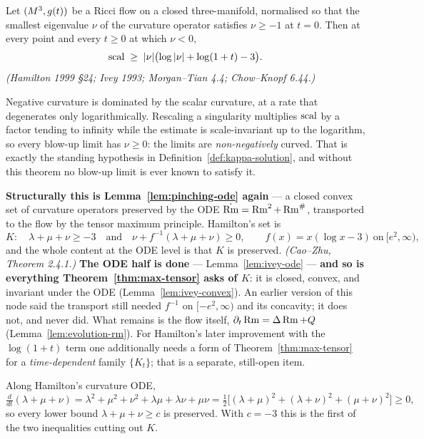\begin{theorem}
  \label{thm:hamilton-ivey}
  Let $(M^3, g(t))$ be a Ricci flow on a closed three-manifold, normalised so
  that the smallest eigenvalue $\nu$ of the curvature operator satisfies
  $\nu \ge -1$ at $t = 0$. Then at every point and every $t \ge 0$ at which
  $\nu < 0$,
  \[
    \operatorname{scal} \;\ge\; |\nu| \bigl( \log |\nu| + \log(1+t) - 3 \bigr).
  \]
  \emph{(Hamilton 1999 §24; Ivey 1993; Morgan--Tian 4.4; Chow--Knopf 6.44.)}

  Negative curvature is dominated by the scalar curvature, at a rate that
  degenerates only logarithmically. Rescaling a singularity multiplies $\operatorname{scal}$
  by a factor tending to infinity while the estimate is scale-invariant up to
  the logarithm, so every blow-up limit has $\nu \ge 0$: the limits are
  \emph{non-negatively} curved. That is exactly the standing hypothesis in
  Definition~\ref{def:kappa-solution}, and without this theorem no blow-up
  limit is ever known to satisfy it.

  \textbf{Structurally this is Lemma~\ref{lem:pinching-ode} again} --- a closed
  convex set of curvature operators preserved by the ODE
  $\dot{\operatorname{Rm}} = \operatorname{Rm}^2 + \operatorname{Rm}^{\#}$, transported to the flow by the tensor
  maximum principle. Hamilton's set is
  \[
    K : \quad \lambda+\mu+\nu \ge -3
    \quad\text{and}\quad
    \nu + f^{-1}(\lambda+\mu+\nu) \ge 0,
    \qquad f(x) = x(\log x - 3) \ \text{on}\ [e^2,\infty),
  \]
  and the whole content at the ODE level is that $K$ is preserved.
  \emph{(Cao--Zhu, Theorem 2.4.1.)} \textbf{The ODE half is done} ---
  Lemma~\ref{lem:ivey-ode} --- \textbf{and so is everything
  Theorem~\ref{thm:max-tensor} asks of $K$}: it is closed, convex, and
  invariant under the ODE (Lemma~\ref{lem:ivey-convex}). An earlier version of
  this node said the transport still needed $f^{-1}$ on $[-e^2,\infty)$ and its
  concavity; it does not, and never did. What remains is the flow itself,
  $\partial_t \operatorname{Rm} = \Delta \operatorname{Rm} + Q$ (Lemma~\ref{lem:evolution-rm}). For
  Hamilton's later improvement with the $\log(1+t)$ term one additionally needs
  a form of Theorem~\ref{thm:max-tensor} for a \emph{time-dependent} family
  $\{K_t\}$; that is a separate, still-open item.
\end{theorem}

\begin{lemma}
  \label{lem:ivey-scal}
  \leanok
  Along Hamilton's curvature ODE,
  \[
    \tfrac{d}{dt}(\lambda+\mu+\nu)
    = \lambda^2+\mu^2+\nu^2+\lambda\mu+\lambda\nu+\mu\nu
    = \tfrac12\bigl[(\lambda+\mu)^2+(\lambda+\nu)^2+(\mu+\nu)^2\bigr] \ge 0,
  \]
  so every lower bound $\lambda+\mu+\nu \ge c$ is preserved. With $c = -3$ this
  is the first of the two inequalities cutting out $K$.
\end{lemma}

